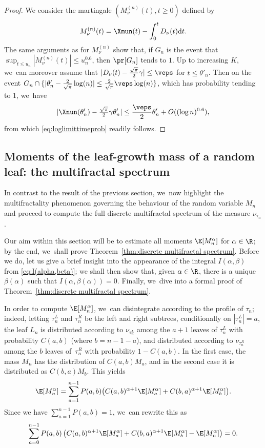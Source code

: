 \begin{proof}
We consider the martingale $(M^{(n)}_{\nu}(t),t\geq 0)$ defined by
\[
M^{(n)}_{\nu}(t)=\Xmun(t)-\int_0^t D_{\nu}(t)\mathrm dt.
\]
The same arguments as for $M^{(n)}_{\nu}$ show that, if $G_n$ is the event that $\sup_{t\leq u_n} |M^{(n)}_{\nu}(t)| \leq u_n^{0.6}$, then $\pr[G_n]$ tends to $1$. Up to increasing $K$, we~can moreover assume that $|D_{\nu}(t)-\nobreak\frac{\sqrt{\pi}}{2}\gamma|\leq \veps$ for $t\leq \theta'_n$. Then on the event $G_n\cap\{|\theta'_n-\frac{2}{\sqrt{\pi}}\log(n)|\leq \frac{2}{\sqrt{\pi}}\veps\log(n)\}$, which has probability tending to $1$, we~have
\[
|\Xnun(\theta'_n)-\tfrac{\sqrt{\pi}}{2}\gamma\theta'_n|\leq \frac{\veps}{2}\theta'_n+O((\log n)^{0.6}),
\]
from which \eqref{eq:loglimittimeprob} readily follows.
\end{proof}

\subsection{Moments of the leaf-growth mass of a random leaf: the multifractal spectrum}\label{section:multifractal spectrum}
In contrast to the result of the previous section, we~now highlight the multifractality phenomenon governing the behaviour of the random variable $M_n$ and proceed to compute the full discrete multifractal spectrum of the measure $\nu_{\tau_n}$.

Our aim within this section will be to estimate all moments $\E[M_n^\alpha]$ for $\alpha\in\R$; by the end, we~shall prove Theorem~\ref{thm:discrete multifractal spectrum}. Before we do, let us give a brief insight into the appearance of the integral $I(\alpha,\beta)$ from \eqref{eq:I(alpha,beta)}; we shall then show that, given $\alpha\in\R$, there is a unique $\beta(\alpha)$ such that $I(\alpha,\beta(\alpha))=0$. Finally, we~dive into a formal proof of Theorem~\ref{thm:discrete multifractal spectrum}.

In order to compute $\E[M_n^\alpha]$, we~can disintegrate according to the profile of $\tau_n$; indeed, letting $\tau_n^L$ and $\tau_n^R$ be the left and right subtrees, conditionally on $|\tau_n^L|=a$, the leaf $L_n$ is distributed according to $\nu_{\tau_n^L}$ among the $a+1$ leaves of $\tau_n^L$ with probability $C(a,b)$ (where $b=n-1-a$), and distributed according to $\nu_{\tau_n^R}$ among the $b$ leaves of~$\tau_n^R$ with probability $1-C(a,b)$. In the first case, the mass $M_n$ has the distribution of $C(a,b)M_a$, and in the second case it is distributed as $C(b,a)M_{b}$. This yields
\[
\E[M_n^\alpha]=\sum_{a=1}^{n-1}P(a,b)\bigl(C(a,b)^{\alpha+1}\E[M_a^\alpha]+C(b,a)^{\alpha+1}\E[M_b^\alpha]\bigr).
\]
Since we have $\sum_{a=1}^{n-1}P(a,b)=1$, we~can rewrite this as
\[
\sum_{a=0}^{n-1}P(a,b)\left(C(a,b)^{\alpha+1} \E[M_a^\alpha]+C(b,a)^{\alpha+1} \E[M_b^\alpha]-\E[M_n^\alpha]\right)=0.
\]

